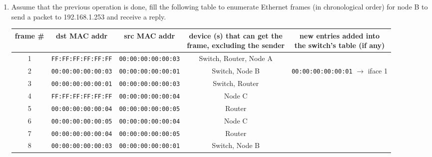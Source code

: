 \documentclass{report}
\begin{document}
\begin{problem}
\begin{enumerate}
\clearpage
  \item Assume that the previous operation is done, fill the following table to
    enumerate Ethernet frames (in chronological order) for node B to send a
    packet to 192.168.1.253 and receive a reply.
  \begin{table}[H]
    \centering
    \begin{tabular*}{1.0\textwidth}{c | c | c | c | c}
      \hline
      frame \# & dst MAC addr               & src MAC addr               & \pbox{15cm}{device (s) that can get the\\ frame, excluding the sender} & \pbox{20cm}{new entries added into \\the switch's table (if any)} \\ \hline
      1        & \texttt{FF:FF:FF:FF:FF:FF} & \texttt{00:00:00:00:00:03} & Switch, Router, Node A                                                 &                                                  \\ 
      2        & \texttt{00:00:00:00:00:03} & \texttt{00:00:00:00:00:01} & Switch, Node B                                                         & \texttt{00:00:00:00:00:01} $\rightarrow$ iface 1 \\ 
      3        & \texttt{00:00:00:00:00:01} & \texttt{00:00:00:00:00:03} & Switch, Router                                                         &                                                  \\ 
      4        & \texttt{FF:FF:FF:FF:FF:FF} & \texttt{00:00:00:00:00:04} & Node C                                                                 &                                                  \\ 
      5        & \texttt{00:00:00:00:00:04} & \texttt{00:00:00:00:00:05} & Router                                                                 &                                                  \\ 
      6        & \texttt{00:00:00:00:00:05} & \texttt{00:00:00:00:00:04} & Node C                                                                 &                                                  \\ 
      7        & \texttt{00:00:00:00:00:04} & \texttt{00:00:00:00:00:05} & Router                                                                 &                                                  \\ 
      8        & \texttt{00:00:00:00:00:03} & \texttt{00:00:00:00:00:01} & Switch, Node B                                                         &                                                  \\ 

\end{tabular*}
\end{table}
\end{enumerate}
\end{problem}
\end{document}
